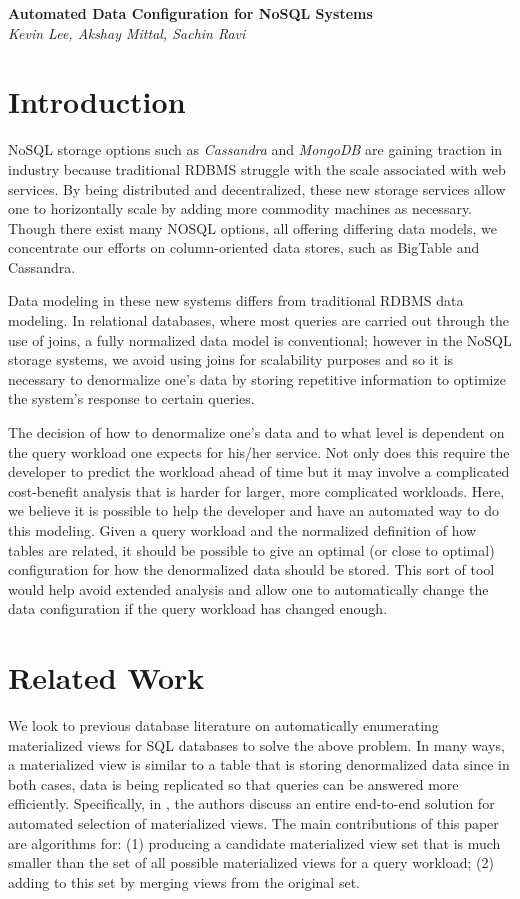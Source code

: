 \documentclass[12pt]{article}
\begin{document}
\pagestyle{plain}

\begin{center}
  \Large\textbf{Automated Data Configuration for NoSQL Systems}\\
  \large\textit{Kevin Lee, Akshay Mittal, Sachin Ravi}
\end{center}

\bigskip

\section{Introduction}
NoSQL storage options such as \emph{Cassandra} and \emph{MongoDB} are gaining traction in industry because traditional
RDBMS struggle with the scale associated with web services. By being distributed and decentralized, these new storage 
services allow one to horizontally scale by adding more commodity machines as necessary. Though there exist many NOSQL
options, all offering differing data models, we concentrate our efforts on column-oriented data stores, such as BigTable
and Cassandra.

Data modeling in these new systems differs from traditional RDBMS data modeling. In relational databases, where most queries
are carried out through the use of joins, a fully normalized data model is conventional; however in the NoSQL storage systems, 
we avoid using joins for scalability purposes and so it is necessary to denormalize one's data by storing repetitive information 
to optimize the system's response to certain queries.

The decision of how to denormalize one's data and to what level is dependent on the query workload one expects for his/her service.
Not only does this require the developer to predict the workload ahead of time but it may involve a complicated cost-benefit analysis that
is harder for larger, more complicated workloads. 
Here, we believe it is possible to help the developer and have an automated way to do this modeling. Given a query workload and 
the normalized definition of how tables are related, it should be possible to give an optimal (or close to optimal) configuration 
for how the denormalized data should be stored. This sort of tool would help avoid extended analysis and allow one to automatically
change the data configuration if the query workload has changed enough.

\section{Related Work}
We look to previous database literature on automatically enumerating materialized views for SQL databases to solve the above problem. 
In many ways, a materialized view is similar to a table that is storing denormalized data since in both cases, data is being replicated so 
that queries can be answered more efficiently. Specifically, in \cite{agrawal2000automated}, the authors discuss an entire end-to-end solution
for automated selection of materialized views. The main contributions of this paper are algorithms for: (1) producing a candidate materialized
view set that is much smaller than the set of all possible materialized views for a query workload; (2) adding to this set by merging views from 
the original set.
\end{document}
